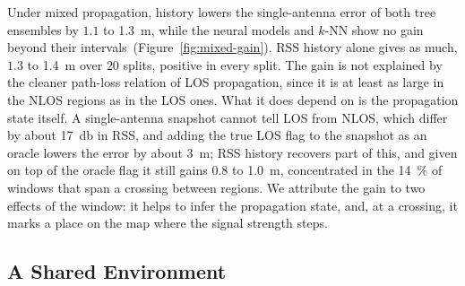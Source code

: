 Under mixed propagation, history lowers the single-antenna error of both tree ensembles by $1.1$ to \SI{1.3}{\meter}, while the neural models and $k$-NN show no gain beyond their intervals~(Figure~\ref{fig:mixed-gain}). RSS history alone gives as much, $1.3$ to \SI{1.4}{\meter} over $20$ splits, positive in every split. The gain is not explained by the cleaner path-loss relation of LOS propagation, since it is at least as large in the NLOS regions as in the LOS ones. What it does depend on is the propagation state itself. A single-antenna snapshot cannot tell LOS from NLOS, which differ by about \SI{17}{\decibel} in RSS, and adding the true LOS flag to the snapshot as an oracle lowers the error by about \SI{3}{\meter}; RSS history recovers part of this, and given on top of the oracle flag it still gains $0.8$ to \SI{1.0}{\meter}, concentrated in the \SI{14}{\percent} of windows that span a crossing between regions. We attribute the gain to two effects of the window: it helps to infer the propagation state, and, at a crossing, it marks a place on the map where the signal strength steps.

\subsection{A Shared Environment}
\label{subsec:shared-env}

